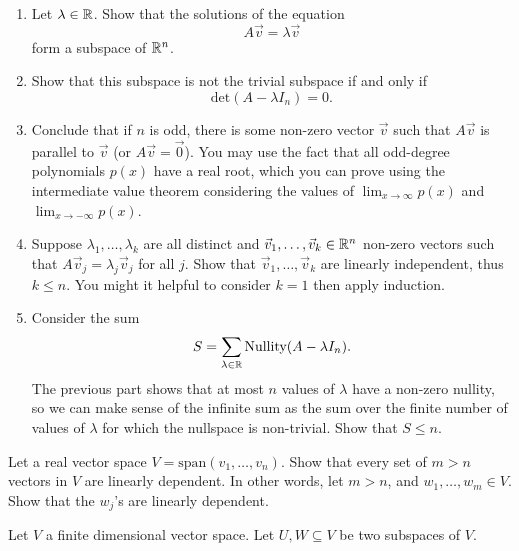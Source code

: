 \begin{exerciselist}
\begin{enumerate}[label=(\alph*)]
		\item Let $\lambda\in\mathbb{R}$. Show that the solutions of the equation \[
			A\vec{v}=\lambda \vec{v}
			\]form a subspace of $\mathbb{R}^n$.
		\item Show that this subspace is not the trivial subspace if and only if \[
		\textrm{det}(A-\lambda I_n)=0.
		\]
		\item Conclude that if $n$ is odd, there is some non-zero vector $\vec{v}$ such that $A\vec{v}$ is parallel to $\vec{v}$ (or $A\vec{v}=\vec{0}$). You may use the fact that all odd-degree polynomials $p(x)$ have a real root, which you can prove using the intermediate value theorem considering the values of $\lim_{x\to \infty}p(x)$ and $\lim_{x\to -\infty}p(x)$. 
		\item Suppose $\lambda_1,\ldots,\lambda_k$ are all distinct and $\vec{v}_1,\ldots,\vec{v}_k\in \mathbb{R}^n$ non-zero vectors such that $A\vec{v}_j=\lambda_j\vec{v}_j$ for all $j$. Show that $\vec{v}_1,\ldots ,\vec{v}_k$ are linearly independent, thus $k\leq n$. You might it helpful to consider $k=1$ then apply induction.
		\item Consider the sum \[
		S=\sum_{\lambda\in\mathbb{R}} \textrm{Nullity}(A-\lambda I_n).
		\]
		The previous part shows that at most $n$ values of $\lambda$ have a non-zero nullity, so we can make sense of the infinite sum as the sum over the finite number of values of $\lambda$ for which the nullspace is non-trivial. Show that $S\leq n$.
	\end{enumerate}
	\item Let a real vector space $V=\textrm{span}(v_1,\ldots, v_n)$. Show that every set of $m>n$ vectors in $V$ are linearly dependent. In other words, let $m>n$, and $w_1,\ldots,w_m\in V$. Show that the $w_j$'s are linearly dependent.
	\item Let $V$ a finite dimensional vector space. Let $U,W\subseteq V$ be two subspaces of $V$. 
	\begin{enumerate}[label=(\alph*)]
		

\end{enumerate}
\end{exerciselist}

